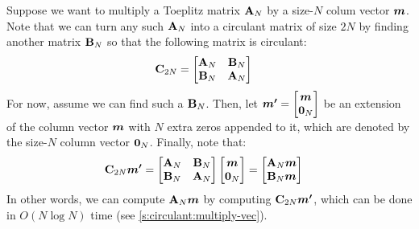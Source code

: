 Suppose we want to multiply a Toeplitz matrix $\mathbf{A}_N$ by a size-$N$ colum vector $\bm{m}$.
Note that we can turn any such $\mathbf{A}_N$ into a circulant matrix of size $2N$ by finding another matrix $\mathbf{B}_N$ so that the following matrix is circulant:
\begin{align}
    \mathbf{C}_{2N} &= \begin{bmatrix}
        \mathbf{A}_N & \mathbf{B}_N\\
        \mathbf{B}_N & \mathbf{A}_N\\
    \end{bmatrix}
\end{align}
For now, assume we can find such a $\mathbf{B}_N$.
Then, let $\bm{m'} = \begin{bmatrix}\bm{m}\\\bm{0}_N\end{bmatrix}$ be an extension of the column vector $\bm{m}$ with $N$ extra zeros appended to it, which are denoted by the size-$N$ column vector $\bm{0}_N$.
Finally, note that:
\begin{align}
     \label{eq:toeplitz-in-circ}
     \mathbf{C}_{2N} \bm{m'}
     &= \begin{bmatrix}
         \mathbf{A}_N & \mathbf{B}_N\\
         \mathbf{B}_N & \mathbf{A}_N\\
     \end{bmatrix} \begin{bmatrix}
     \bm{m}\\
     \bm{0}_N
     \end{bmatrix}
     = \begin{bmatrix}
         \mathbf{A}_N \bm{m}\\
         \mathbf{B}_N \bm{m}\\
     \end{bmatrix}
\end{align}
In other words, we can compute $\mathbf{A}_N \bm{m}$ by computing $\mathbf{C}_{2N}\bm{m'}$, which can be done in $O(N\log{N})$ time (see \cref{s:circulant:multiply-vec}).

